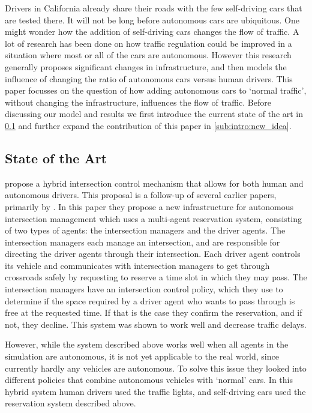 Drivers in California already share their roads with the few self-driving cars that are tested there. It will not be long before autonomous cars are ubiquitous. One might wonder how the addition of self-driving cars changes the flow of traffic. A lot of research has been done on how traffic regulation could be improved in a situation where most or all of the cars are autonomous. However this research generally proposes significant changes in infrastructure, and then models the influence of changing the ratio of autonomous cars versus human drivers. This paper focusses on the question of how adding autonomous cars to `normal traffic', without changing the infrastructure, influences the flow of traffic. Before discussing our model and results we first introduce the current state of the art in \cref{sub:intro:state_of_the_art} and further expand the contribution of this paper in \cref{sub:intro:new_idea}.

\subsection{State of the Art}
\label{sub:intro:state_of_the_art}
\textcite{dresner2007sharing} propose a hybrid intersection control mechanism that allows for both human and autonomous drivers. This proposal is a follow-up of several earlier papers, primarily by \textcite{dresner2005traffic}. In this paper they propose a new infrastructure for autonomous intersection management which uses a multi-agent reservation system, consisting of two types of agents: the intersection managers and the driver agents. The intersection managers each manage an intersection, and are responsible for directing the driver agents through their intersection. Each driver agent controls its vehicle and communicates with intersection managers to get through crossroads safely by requesting to reserve a time slot in which they may pass. The intersection managers have an intersection control policy, which they use to determine if the space required by a driver agent who wants to pass through is free at the requested time. If that is the case they confirm the reservation, and if not, they decline. This system was shown to work well and decrease traffic delays. 

However, while the system described above works well when all agents in the simulation are autonomous, it is not yet applicable to the real world, since currently hardly any vehicles are autonomous. To solve this issue they looked into different policies that combine autonomous vehicles with `normal' cars. In this hybrid system human drivers used the traffic lights, and self-driving cars used the reservation system described above.

